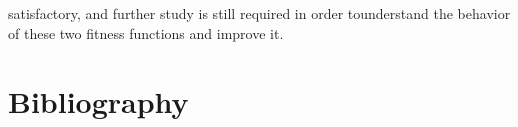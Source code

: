 \documentclass[11pt]{article}
\theoremstyle{definition}
\begin{document}
satisfactory, and further study is still required in order tounderstand the behavior of these two fitness functions and improve it.

\section{Bibliography}
\printbibliography[]
\end{document}
